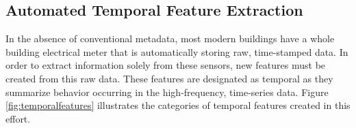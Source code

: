 \subsection{Automated Temporal Feature Extraction}

In the absence of conventional metadata, most modern buildings have a whole building electrical meter that is automatically storing raw, time-stamped data. In order to extract information solely from these sensors, new features must be created from this raw data.  These features are designated as temporal as they summarize behavior occurring in the high-frequency, time-series data. Figure \ref{fig:temporalfeatures} illustrates the categories of temporal features created in this effort.

